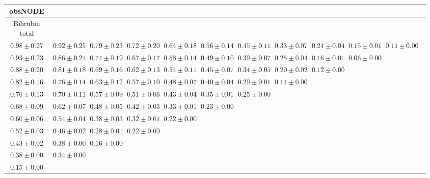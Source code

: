 \begin{table}[ht]
\centering
{\tiny
{
\begin{adjustbox}{width=\textwidth}
\begin{tabular}{cccccccccccc}
\hline
obsNODE &  &  &  &  &  &  &  &  &  & \\
\hline
Bilirubin total &  &  &  &  &  &  &  &  &  & \\
\hline
$0.98 \pm 0.27$ & $0.92 \pm 0.25$ & $0.79 \pm 0.23$ & $0.72 \pm 0.20$ & $0.64 \pm 0.18$ & $0.56 \pm 0.14$ & $0.45 \pm 0.11$ & $0.33 \pm 0.07$ & $0.24 \pm 0.04$ & $0.15 \pm 0.01$ & $0.11 \pm 0.00$ &  \\
$0.93 \pm 0.23$ & $0.86 \pm 0.21$ & $0.74 \pm 0.19$ & $0.67 \pm 0.17$ & $0.58 \pm 0.14$ & $0.49 \pm 0.10$ & $0.39 \pm 0.07$ & $0.25 \pm 0.04$ & $0.16 \pm 0.01$ & $0.06 \pm 0.00$ &  &  \\
$0.88 \pm 0.20$ & $0.81 \pm 0.18$ & $0.69 \pm 0.16$ & $0.62 \pm 0.13$ & $0.54 \pm 0.11$ & $0.45 \pm 0.07$ & $0.34 \pm 0.05$ & $0.20 \pm 0.02$ & $0.12 \pm 0.00$ &  &  &  \\
$0.82 \pm 0.16$ & $0.76 \pm 0.14$ & $0.63 \pm 0.12$ & $0.57 \pm 0.10$ & $0.48 \pm 0.07$ & $0.40 \pm 0.04$ & $0.29 \pm 0.01$ & $0.14 \pm 0.00$ &  &  &  &  \\
$0.76 \pm 0.13$ & $0.70 \pm 0.11$ & $0.57 \pm 0.09$ & $0.51 \pm 0.06$ & $0.43 \pm 0.04$ & $0.35 \pm 0.01$ & $0.25 \pm 0.00$ &  &  &  &  &  \\
$0.68 \pm 0.09$ & $0.62 \pm 0.07$ & $0.48 \pm 0.05$ & $0.42 \pm 0.03$ & $0.33 \pm 0.01$ & $0.23 \pm 0.00$ &  &  &  &  &  &  \\
$0.60 \pm 0.06$ & $0.54 \pm 0.04$ & $0.38 \pm 0.03$ & $0.32 \pm 0.01$ & $0.22 \pm 0.00$ &  &  &  &  &  &  &  \\
$0.52 \pm 0.03$ & $0.46 \pm 0.02$ & $0.28 \pm 0.01$ & $0.22 \pm 0.00$ &  &  &  &  &  &  &  &  \\
$0.43 \pm 0.02$ & $0.38 \pm 0.00$ & $0.16 \pm 0.00$ &  &  &  &  &  &  &  &  &  \\
$0.38 \pm 0.00$ & $0.34 \pm 0.00$ &  &  &  &  &  &  &  &  &  &  \\
$0.15 \pm 0.00$ &  &  &  &  &  &  &  &  &  &  &  \\



\end{tabular}
\end{adjustbox}}}
\end{table}
